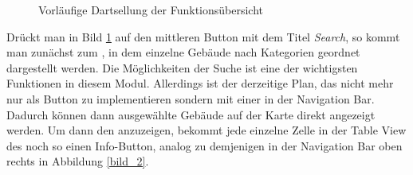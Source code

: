 \documentclass{report}
\begin{document}
\begin{figure}[ht]
\centering {}
\caption{Vorläufige Dartsellung der Funktionsübersicht}\label{bild_5}
\end{figure}

Drückt man in Bild \ref{bild_5} auf den mittleren Button mit dem Titel \emph{Search}, so kommt man zunächst zum , in dem einzelne Gebäude nach Kategorien geordnet dargestellt werden. Die Möglichkeiten der Suche ist eine der wichtigsten Funktionen in diesem Modul. Allerdings ist der derzeitige Plan, das nicht mehr nur als Button zu implementieren sondern mit einer  in der Navigation Bar. Dadurch können dann ausgewählte Gebäude auf der Karte direkt angezeigt werden. Um dann den  anzuzeigen, bekommt jede einzelne Zelle in der Table View des  noch so einen Info-Button, analog zu demjenigen in der Navigation Bar oben rechts in Abbildung \ref{bild_2}.
\end{document}
